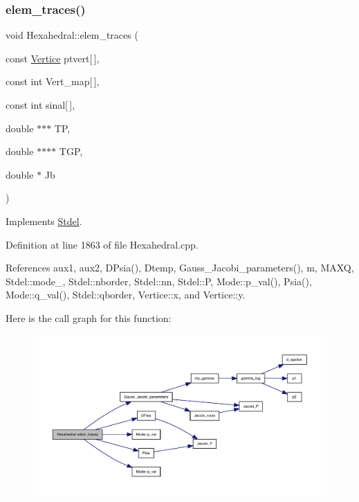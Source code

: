 \subsubsection{\texorpdfstring{elem\+\_\+traces()}{elem\_traces()}}
{\footnotesize\ttfamily void Hexahedral\+::elem\+\_\+traces (\begin{DoxyParamCaption}\item[{const \hyperlink{structVertice}{Vertice}}]{ptvert\mbox{[}$\,$\mbox{]},  }\item[{const int}]{Vert\+\_\+map\mbox{[}$\,$\mbox{]},  }\item[{const int}]{sinal\mbox{[}$\,$\mbox{]},  }\item[{double $\ast$$\ast$$\ast$}]{TP,  }\item[{double $\ast$$\ast$$\ast$$\ast$}]{T\+GP,  }\item[{double $\ast$}]{Jb }\end{DoxyParamCaption})\hspace{0.3cm}{\ttfamily [virtual]}}



Implements \hyperlink{classStdel_a3d72869352a2ff5eeb23972eca3b391e}{Stdel}.



Definition at line 1863 of file Hexahedral.\+cpp.



References aux1, aux2, D\+Psia(), Dtemp, Gauss\+\_\+\+Jacobi\+\_\+parameters(), m, M\+A\+XQ, Stdel\+::mode\+\_\+, Stdel\+::nborder, Stdel\+::nn, Stdel\+::P, Mode\+::p\+\_\+val(), Psia(), Mode\+::q\+\_\+val(), Stdel\+::qborder, Vertice\+::x, and Vertice\+::y.

Here is the call graph for this function\+:
\nopagebreak
\begin{figure}[H]
\begin{center}
\leavevmode
\includegraphics[width=350pt]{classHexahedral_a795f04a1d90b00114cc30a26355a6e9b_cgraph}
\end{center}
\end{figure}
\mbox{\label{classHexahedral_a74909a28bef5ee2b4de02d571061fed8}} 
